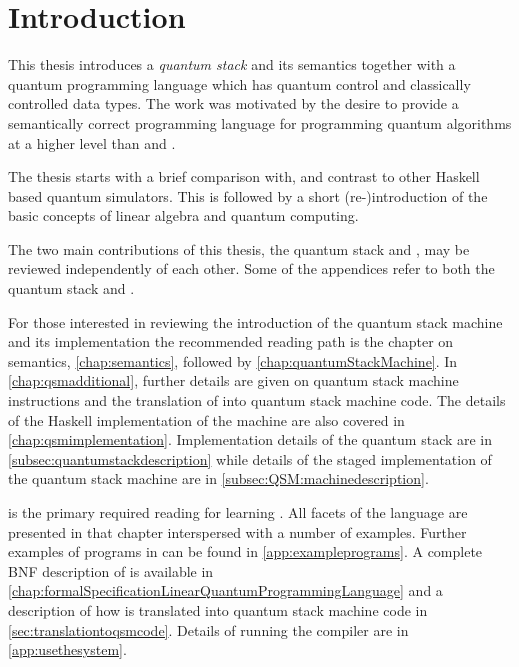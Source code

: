 \chapter{Introduction}\label{chap:introduction}
This thesis introduces a \emph{quantum stack} and its semantics 
together with a   quantum 
programming language  which has quantum control and classically controlled
data types. The work was motivated by the 
desire to provide a semantically correct programming language for
programming quantum algorithms at a higher level than \bits{} and \qbits.

The thesis starts with a brief comparison with, 
and contrast to other Haskell based
quantum simulators. This is followed by a short (re-)introduction of the 
basic concepts of linear algebra and quantum computing. 


The two main contributions of this thesis, the quantum stack and \lqpl{},
 may be reviewed independently of
each other. Some of the appendices refer to both the quantum stack and 
\lqpl. 

For those interested
in reviewing the introduction of the quantum stack machine and its 
implementation the recommended reading path is the chapter on
semantics, \ref{chap:semantics}, 
followed by   \ref{chap:quantumStackMachine}. In
 \ref{chap:qsmadditional}, further details are given on
quantum stack machine instructions and 
the translation of \lqpl{} into quantum stack machine code. 
The details of the Haskell
implementation of the machine are also covered in 
  \ref{chap:qsmimplementation}. 
Implementation  details of the quantum stack are 
in \ref{subsec:quantumstackdescription} while  details
of the staged implementation of the quantum stack machine are
 in   \ref{subsec:QSM:machinedescription}.

  is
the primary required reading for learning \lqpl. All facets of the language
are presented in that chapter interspersed with a number of examples. 
Further examples of programs in \lqpl{} can be found  in 
 \ref{app:exampleprograms}. 
A complete BNF
description of \lqpl{} is available in  
 \ref{chap:formalSpecificationLinearQuantumProgrammingLanguage} and a
 description of how \lqpl{} is translated into quantum stack machine
code  in  \ref{sec:translationtoqsmcode}. 
 Details of running the compiler
 are in   \ref{app:usethesystem}.

